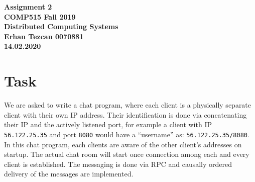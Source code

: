 \documentclass[11pt,reqno]{amsart}
\newcommand{\code}[1]{\texttt{#1}}
\begin{document}
\begin{center}
\large\textbf{Assignment 2 \\ COMP515 Fall 2019} \\
\normalsize\textbf{Distributed Computing Systems \\  Erhan Tezcan 0070881 \\ 14.02.2020} \\
\end{center}

\section{Task}
We are asked to write a chat program, where each client is a physically separate client with their own IP address. Their identification is done via concatenating their IP and the actively listened port, for example a client with IP \code{56.122.25.35} and port \code{8080} would have a ``username'' as: \code{56.122.25.35/8080}. In this chat program, each clients are aware of the other client's addresses on startup. The actual chat room will start once connection among each and every client is established. The messaging is done via RPC and causally ordered delivery of the messages are implemented.
\end{document}

